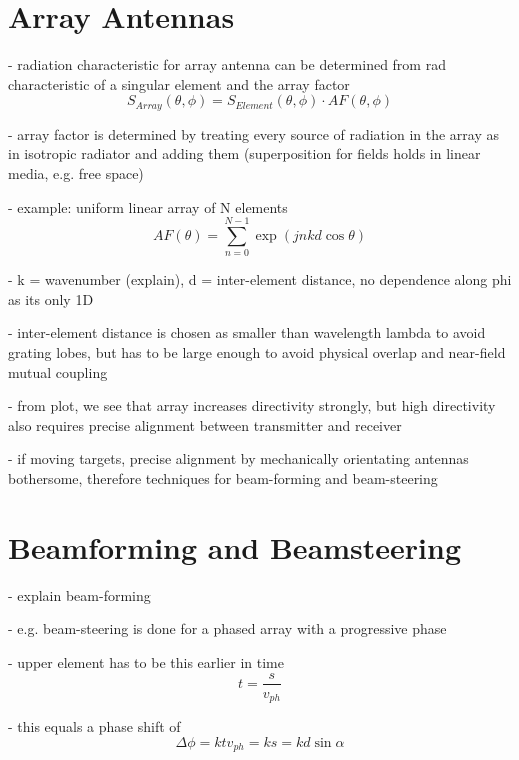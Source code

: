 \documentclass[]{report}
\begin{document}
\section{Array Antennas}
- radiation characteristic for array antenna can be determined from rad characteristic of a singular element and the array factor
\begin{equation}
	S_{Array}(\theta, \phi) = S_{Element}(\theta, \phi) \cdot AF(\theta, \phi)
\end{equation}

- array factor is determined by treating every source of radiation in the array as in isotropic radiator and adding them (superposition for fields holds in linear media, e.g. free space)

- example: uniform linear array of N elements
\begin{equation}
	AF(\theta) = \sum_{n=0}^{N-1}\exp(jnkd\cos\theta)
\end{equation}

- k = wavenumber (explain), d = inter-element distance, no dependence along phi as its only 1D

- inter-element distance is chosen as smaller than wavelength lambda to avoid grating lobes, but has to be large enough to avoid physical overlap and near-field mutual coupling

- from plot, we see that array increases directivity strongly, but high directivity also requires precise alignment between transmitter and receiver

- if moving targets, precise alignment by mechanically orientating antennas bothersome, therefore techniques for beam-forming and beam-steering

\section{Beamforming and Beamsteering}

- explain beam-forming

- e.g. beam-steering is done for a phased array with a progressive phase

- upper element has to be this earlier in time
\begin{equation}
	t = \frac{s}{v_{ph}}
\end{equation}

- this equals a phase shift of
\begin{equation}
	\Delta \phi = k t v_{ph} = k s = k d\sin\alpha
\end{equation}
\end{document}
